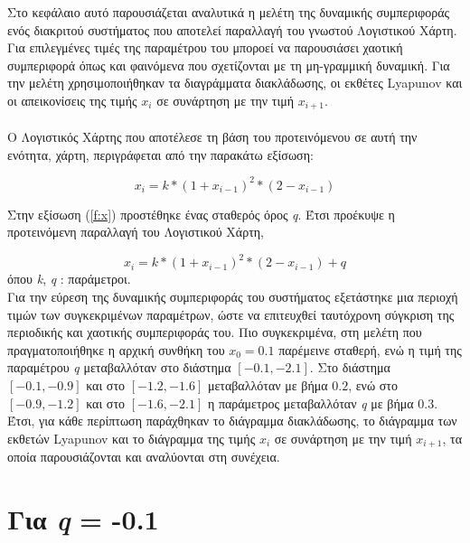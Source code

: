 Στο κεφάλαιο αυτό παρουσιάζεται αναλυτικά η μελέτη της δυναμικής συμπεριφοράς ενός διακριτού συστήματος που αποτελεί παραλλαγή του γνωστού Λογιστικού Χάρτη. Για επιλεγμένες τιμές της παραμέτρου του μποροεί να παρουσιάσει χαοτική συμπεριφορά όπως και φαινόμενα που σχετίζονται με τη μη-γραμμική δυναμική. Για την μελέτη χρησιμοποιήθηκαν τα διαγράμματα διακλάδωσης, οι εκθέτες Lyapunov και οι απεικονίσεις της τιμής \(x_i\) σε συνάρτηση με  την τιμή \(x_{i+1}\).\\\\
Ο Λογιστικός Χάρτης που αποτέλεσε τη βάση του προτεινόμενου σε αυτή την ενότητα, χάρτη, περιγράφεται από την παρακάτω εξίσωση:

\begin{equation}
	x_i=k*(1+x_{i-1})^2 *(2-x_{i-1})
	\label{f:x}
\end{equation}


Στην εξίσωση (\ref{f:x}) προστέθηκε ένας σταθερός όρος \emph{q}. Έτσι προέκυψε η προτεινόμενη παραλλαγή του Λογιστικού Χάρτη,

\begin{equation}
	x_i=k*(1+x_{i-1})^2 *(2-x_{i-1}) +q
	\label{f:x1}
\end{equation}
όπου \emph{k}, \emph{q} : παράμετροι.\\

Για την εύρεση της δυναμικής συμπεριφοράς του συστήματος εξετάστηκε μια περιοχή τιμών των συγκεκριμένων παραμέτρων, ώστε να επιτευχθεί ταυτόχρονη σύγκριση της περιοδικής και χαοτικής συμπεριφοράς του. Πιο συγκεκριμένα, στη μελέτη που πραγματοποιήθηκε η αρχική συνθήκη του $x_0 =0.1$ παρέμεινε  σταθερή, ενώ η τιμή της παραμέτρου \emph{q} μεταβαλλόταν στο διάστημα $[-0.1,-2.1]$. Στο διάστημα  $[-0.1,-0.9]$ και στο $[-1.2,-1.6]$ μεταβαλλόταν με βήμα $0.2$, ενώ στο $[-0.9,-1.2]$ και στο $[-1.6,-2.1]$ η παράμετρος  μεταβαλλόταν \emph{q} με βήμα $0.3$. Έτσι, για κάθε περίπτωση παράχθηκαν το διάγραμμα διακλάδωσης, το διάγραμμα των εκθετών Lyapunov και το διάγραμμα της τιμής \(x_i\) σε συνάρτηση με  την τιμή \(x_{i+1}\), τα οποία παρουσιάζονται και αναλύονται στη συνέχεια.\\
\vspace{\fill}

\section{Για \emph{q} = -0.1 }

